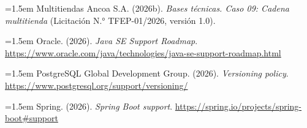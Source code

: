 \documentclass[11pt]{article}
\begin{document}
\noindent\hangindent=1.5em Multitiendas Ancoa S.A. (2026b). \emph{Bases técnicas. Caso 09: Cadena multitienda} (Licitación N.° TFEP-01/2026, versión 1.0).

\noindent\hangindent=1.5em Oracle. (2026). \emph{Java SE Support Roadmap}. \url{https://www.oracle.com/java/technologies/java-se-support-roadmap.html}

\noindent\hangindent=1.5em PostgreSQL Global Development Group. (2026). \emph{Versioning policy}. \url{https://www.postgresql.org/support/versioning/}

\noindent\hangindent=1.5em Spring. (2026). \emph{Spring Boot support}. \url{https://spring.io/projects/spring-boot#support}

\ossFinalPage
\end{document}
